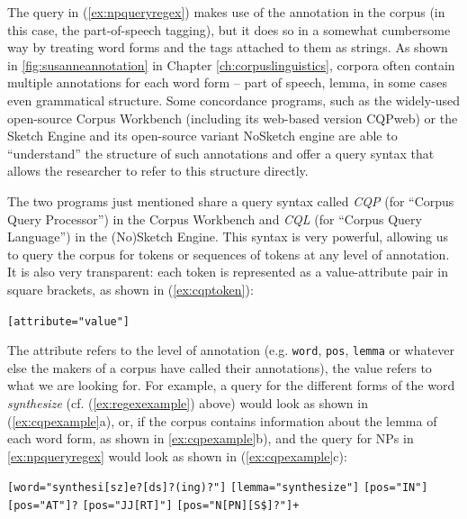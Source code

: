 The query in (\ref{ex:npqueryregex}) makes use of the annotation in the corpus (in this case, the part-of-speech tagging), but it does so in a somewhat cumbersome way by treating word forms and the tags attached to them as strings. As shown in \ref{fig:susanneannotation} in Chapter \ref{ch:corpuslinguistics}, corpora often contain multiple annotations for each word form -- part of speech, lemma, in some cases even grammatical structure. Some concordance programs, such as the widely-used open-source Corpus Workbench (including its web-based version CQPweb) \citep[cf.][]{evert_twenty-first_2011} or the Sketch Engine and its open-source variant NoSketch engine \citep[cf.][]{kilgarriff_sketch_2014} are able to ``understand'' the structure of such annotations and offer a query syntax that allows the researcher to refer to this structure directly.

The two programs just mentioned share a query syntax called \emph{CQP} (for ``Corpus Query Processor'') in the Corpus Workbench and \emph{CQL} (for ``Corpus Query Language'') in the (No)Sketch Engine. This syntax is very powerful, allowing us to query the corpus for tokens or sequences of tokens at any level of annotation. It is also very transparent: each token is represented as a value-attribute pair in square brackets, as shown in (\ref{ex:cqptoken}): 

\begin{exe}
\ex \texttt{[attribute="value"]}
\label{ex:cqptoken}
\end{exe}

The attribute refers to the level of annotation (e.g. \texttt{word}, \texttt{pos}, \texttt{lemma} or whatever else the makers of a corpus have called their annotations), the value refers to what we are looking for. For example, a query for the different forms of the word \textit{synthesize} (cf. (\ref{ex:regexexample}) above) would look as shown in (\ref{ex:cqpexample}a), or, if the corpus contains information about the lemma of each word form, as shown in \ref{ex:cqpexample}b), and the query for NPs in \ref{ex:npqueryregex} would look as shown in (\ref{ex:cqpexample}c):

\begin{exe}
\ex
\begin{xlist} 
\label{ex:cqpexample}
\ex \texttt{[word="synthesi[sz]e?[ds]?(ing)?"]}
\ex \texttt{[lemma="synthesize"]}
\ex \texttt{[pos="IN"]} \texttt{[pos="AT"]?} \texttt{[pos="JJ[RT]"]\*} \texttt{[pos="N[PN][S\$]?"]+}
\end{xlist}
\end{exe}

